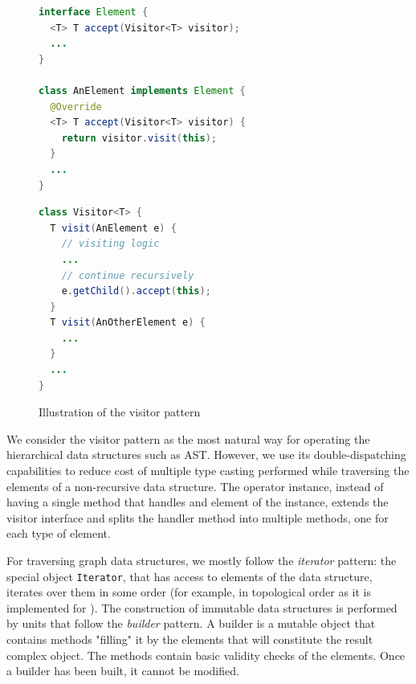 \begin{figure}[h]
\centering
\begin{minipage}[t]{.55\textwidth}
\begin{lstlisting}[language=java]
interface Element {
  <T> T accept(Visitor<T> visitor);
  ...
}

class AnElement implements Element {
  @Override
  <T> T accept(Visitor<T> visitor) {
    return visitor.visit(this);
  }
  ...
}
\end{lstlisting}
\end{minipage}%
\begin{minipage}[t]{.45\textwidth}
\begin{lstlisting}[language=java]
class Visitor<T> {
  T visit(AnElement e) {
    // visiting logic
    ...
    // continue recursively
    e.getChild().accept(this);
  }
  T visit(AnOtherElement e) {
    ...
  }
  ...
}
\end{lstlisting}
\end{minipage}
\caption{Illustration of the visitor pattern}
\label{fig:visitor}
\end{figure}

We consider the visitor pattern as the most natural way for operating the hierarchical data structures such as AST.
However, we use its double-dispatching capabilities to reduce cost of multiple type casting performed while traversing the elements of a non-recursive data structure.
The operator instance, instead of having a single method that handles and element of the instance, extends the visitor interface and splits the handler method into multiple methods, one for each type of element.

For traversing graph data structures, we mostly follow the \textit{iterator} pattern: the special object \texttt{Iterator}, that has access to elements of the data structure, iterates over them in some order (for example, in topological order as it is implemented for \xgraph{}).
The construction of immutable data structures is performed by units that follow the \textit{builder} pattern.
A builder is a mutable object that contains methods "filling" it by the elements that will constitute the result complex object.
The methods contain basic validity checks of the elements.
Once a builder has been built, it cannot be modified.


